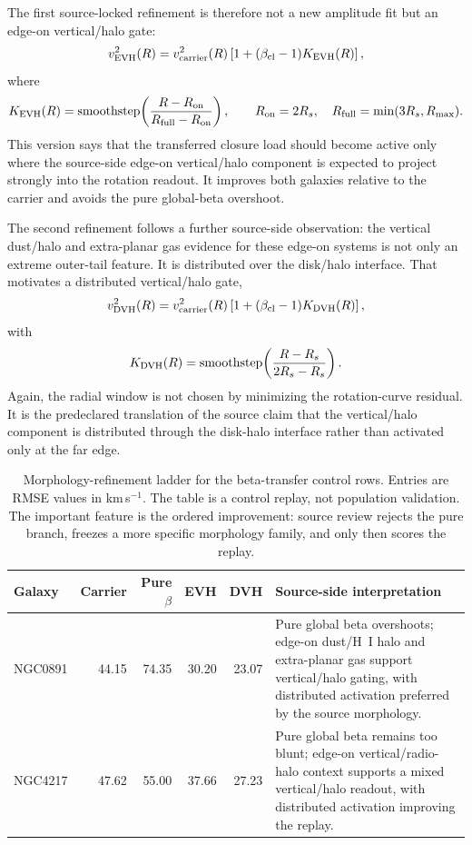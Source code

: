 \documentclass[11pt]{article}
\begin{document}
The first source-locked refinement is therefore not a new amplitude fit but an
edge-on vertical/halo gate:
\[
  v_{\rm EVH}^{2}(R)
  =
  v_{\rm carrier}^{2}(R)
  \left[1+(\beta_{\rm cl}-1)K_{\rm EVH}(R)\right],
\]
where
\[
  K_{\rm EVH}(R)
  =
  {\rm smoothstep}\!\left(
    \frac{R-R_{\rm on}}{R_{\rm full}-R_{\rm on}}
  \right),
  \qquad
  R_{\rm on}=2R_s,\quad
  R_{\rm full}=\min(3R_s,R_{\max}).
\]
This version says that the transferred closure load should become active only
where the source-side edge-on vertical/halo component is expected to project
strongly into the rotation readout.  It improves both galaxies relative to the
carrier and avoids the pure global-beta overshoot.

The second refinement follows a further source-side observation: the vertical
dust/halo and extra-planar gas evidence for these edge-on systems is not only
an extreme outer-tail feature.  It is distributed over the disk/halo interface.
That motivates a distributed vertical/halo gate,
\[
  v_{\rm DVH}^{2}(R)
  =
  v_{\rm carrier}^{2}(R)
  \left[1+(\beta_{\rm cl}-1)K_{\rm DVH}(R)\right],
\]
with
\[
  K_{\rm DVH}(R)
  =
  {\rm smoothstep}\!\left(\frac{R-R_s}{2R_s-R_s}\right).
\]
Again, the radial window is not chosen by minimizing the rotation-curve
residual.  It is the predeclared translation of the source claim that the
vertical/halo component is distributed through the disk-halo interface rather
than activated only at the far edge.

\begin{table}[H]
\centering
\small
\begin{tabularx}{\linewidth}{@{}lrrrrX@{}}
\toprule
Galaxy & Carrier & Pure \(\beta\) & EVH & DVH & Source-side interpretation \\
\midrule
NGC0891 & 44.15 & 74.35 & 30.20 & 23.07 &
Pure global beta overshoots; edge-on dust/H~I halo and extra-planar gas
support vertical/halo gating, with distributed activation preferred by the
source morphology. \\
NGC4217 & 47.62 & 55.00 & 37.66 & 27.23 &
Pure global beta remains too blunt; edge-on vertical/radio-halo context
supports a mixed vertical/halo readout, with distributed activation improving
the replay. \\
\bottomrule
\end{tabularx}
\caption{Morphology-refinement ladder for the beta-transfer control rows.
Entries are RMSE values in km\,s\(^{-1}\).  The table is a control replay, not
population validation.  The important feature is the ordered improvement:
source review rejects the pure branch, freezes a more specific morphology
family, and only then scores the replay.}
\label{tab:beta-transfer-morphology-refinement-ladder}
\end{table}
\end{document}

